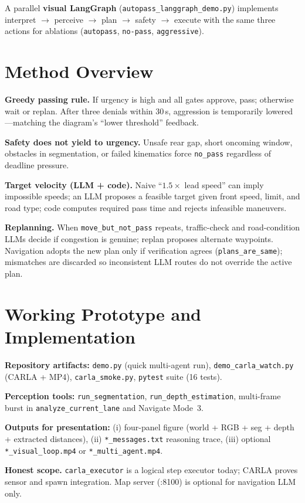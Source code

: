 \documentclass[10pt,twocolumn,letterpaper]{article}
\begin{document}
A parallel \textbf{visual LangGraph} (\texttt{autopass\_langgraph\_demo.py}) implements interpret $\rightarrow$ perceive $\rightarrow$ plan $\rightarrow$ safety $\rightarrow$ execute with the same three actions for ablations (\texttt{autopass}, \texttt{no-pass}, \texttt{aggressive}).

\section{Method Overview}
\textbf{Greedy passing rule.}
If urgency is high and all gates approve, pass; otherwise wait or replan.
After three denials within 30\,s, aggression is temporarily lowered---matching the diagram's ``lower threshold'' feedback.

\textbf{Safety does not yield to urgency.}
Unsafe rear gap, short oncoming window, obstacles in segmentation, or failed kinematics force \texttt{no\_pass} regardless of deadline pressure.

\textbf{Target velocity (LLM + code).}
Naive ``$1.5\times$ lead speed'' can imply impossible speeds; an LLM proposes a feasible target given front speed, limit, and road type; code computes required pass time and rejects infeasible maneuvers.

\textbf{Replanning.}
When \texttt{move\_but\_not\_pass} repeats, traffic-check and road-condition LLMs decide if congestion is genuine; replan proposes alternate waypoints.
Navigation adopts the new plan only if verification agrees (\texttt{plans\_are\_same}); mismatches are discarded so inconsistent LLM routes do not override the active plan.

\section{Working Prototype and Implementation}
\textbf{Repository artifacts:} \texttt{demo.py} (quick multi-agent run), \texttt{demo\_carla\_watch.py} (CARLA + MP4), \texttt{carla\_smoke.py}, \texttt{pytest} suite (16 tests).

\textbf{Perception tools:} \texttt{run\_segmentation}, \texttt{run\_depth\_estimation}, multi-frame burst in \texttt{analyze\_current\_lane} and Navigate Mode~3.

\textbf{Outputs for presentation:} (i) four-panel figure (world + RGB + seg + depth + extracted distances), (ii) \texttt{*\_messages.txt} reasoning trace, (iii) optional \texttt{*\_visual\_loop.mp4} or \texttt{*\_multi\_agent.mp4}.

\textbf{Honest scope.}
\texttt{carla\_executor} is a logical step executor today; CARLA proves sensor and spawn integration.
Map server (:8100) is optional for navigation LLM only.
\end{document}
